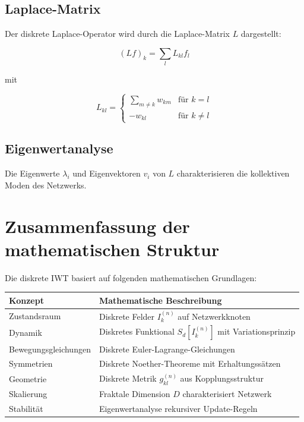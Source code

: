 \subsection{Laplace-Matrix}
\label{sub:mathematik_laplace}

Der diskrete Laplace-Operator wird durch die Laplace-Matrix \( L \) dargestellt:

\[
(Lf)_k = \sum_l L_{kl} f_l
\]

mit

\[
L_{kl} = \begin{cases}
\sum_{m \neq k} w_{km} & \text{für } k = l \\
-w_{kl} & \text{für } k \neq l
\end{cases}
\]

\subsection{Eigenwertanalyse}
\label{sub:mathematik_eigenwerte}

Die Eigenwerte \( \lambda_i \) und Eigenvektoren \( v_i \) von \( L \) charakterisieren die kollektiven Moden des Netzwerks.

\section{Zusammenfassung der mathematischen Struktur}
\label{app:mathematik_zusammenfassung}

Die diskrete IWT basiert auf folgenden mathematischen Grundlagen:

\begin{tabular}{|l|l|}
\hline
\textbf{Konzept} & \textbf{Mathematische Beschreibung} \\
\hline
Zustandsraum & Diskrete Felder \( I_k^{(n)} \) auf Netzwerkknoten \\
Dynamik & Diskretes Funktional \( S_d[I_k^{(n)}] \) mit Variationsprinzip \\
Bewegungsgleichungen & Diskrete Euler-Lagrange-Gleichungen \\
Symmetrien & Diskrete Noether-Theoreme mit Erhaltungssätzen \\
Geometrie & Diskrete Metrik \( g_{kl}^{(n)} \) aus Kopplungsstruktur \\
Skalierung & Fraktale Dimension \( D \) charakterisiert Netzwerk \\
Stabilität & Eigenwertanalyse rekursiver Update-Regeln \\
\hline
\end{tabular}

